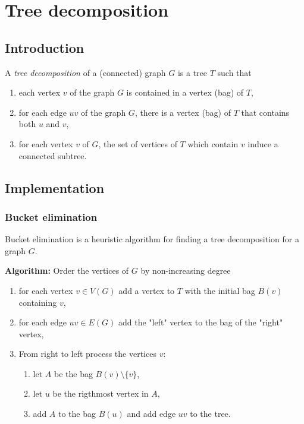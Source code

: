 \chapter{Tree decomposition}

\section{Introduction}

A \emph{tree decomposition} of a (connected) graph $G$ is a tree $T$ such that
\begin{enumerate}
    \item each vertex $v$ of the graph $G$ is contained in a vertex (bag) of $T$,
    \item for each edge $uv$ of the graph $G$, there is a vertex (bag) of $T$ that contains both $u$ and $v$,
    \item for each vertex $v$ of $G$, the set of vertices of $T$ which contain $v$ induce a connected subtree.
\end{enumerate}

\section{Implementation}

\subsection{Bucket elimination}

Bucket elimination is a heuristic algorithm for finding a tree decomposition for a graph $G$.

\medskip
\noindent \textbf{Algorithm:}
Order the vertices of $G$ by non-increasing degree
\begin{enumerate}
    \item for each vertex $v \in V(G)$ add a vertex to $T$ with the initial bag $B(v)$ containing $v$,
    \item for each edge $uv \in E(G)$ add the "left" vertex to the bag of the "right" vertex,
    \item From right to left process the vertices $v$:
    \begin{enumerate}
        \item let $A$ be the bag $B(v) \setminus \{v\}$,
        \item let $u$ be the rigthmost vertex in $A$,
        \item add $A$ to the bag $B(u)$ and add  edge $uv$ to the tree.
    \end{enumerate}
\end{enumerate}

